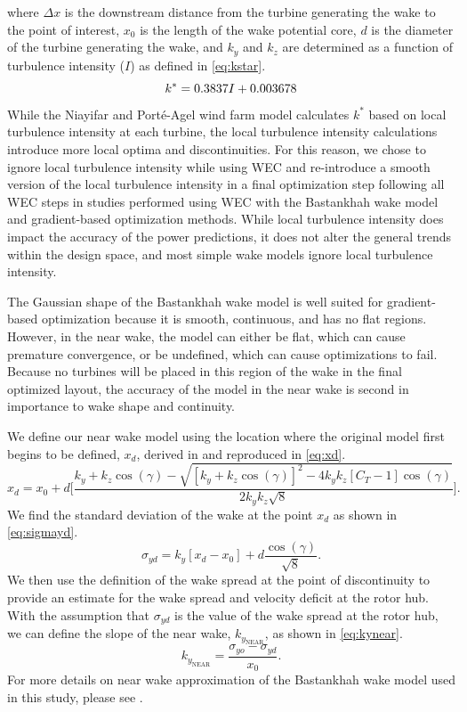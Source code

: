 \documentclass[journal abbreviation, manuscript]{copernicus}
\begin{document}
	where $\Delta x$ is the downstream distance from the turbine generating the wake to the point of interest, $x_0$ is the length of the wake potential core, $d$ is the diameter of the turbine generating the wake, and $k_y$ and $k_z$ are determined as a function of turbulence intensity ($I$) as defined in \ref{eq:kstar}\cite{niayifar2016}.
	\begin{equation}\label{eq:kstar}
		\centering
		k^* = 0.3837I + 0.003678
	\end{equation}
	While the Niayifar and Port\'e-Agel wind farm model calculates $k^*$ based on local turbulence intensity at each turbine, the local turbulence intensity calculations introduce more local optima and discontinuities. For this reason, we chose to ignore local turbulence intensity while using WEC and re-introduce a smooth version of the local turbulence intensity in a final optimization step following all WEC steps in studies performed using WEC with the Bastankhah wake model and gradient-based optimization methods. While local turbulence intensity does impact the accuracy of the power predictions, it does not alter the general trends within the design space, and most simple wake models ignore local turbulence intensity. 
	
	The Gaussian shape of the Bastankhah wake model is well suited for gradient-based optimization because it is smooth, continuous, and has no flat regions. However, in the near wake, the model can either be flat, which can cause premature convergence, or be undefined, which can cause optimizations to fail. Because no turbines will be placed in this region of the wake in the final optimized layout, the accuracy of the model in the near wake is second in importance to wake shape and continuity. 
	
	We define our near wake model using the location where the original model first begins to be defined, $x_d$, derived in \cite{thomas2019-les-validation} and reproduced in \ref{eq:xd}.
	\begin{equation}\label{eq:xd}
		x_d = x_0 +d \Bigg[ \frac{k_y+k_z\cos{(\gamma)} - \sqrt{[k_y+k_z\cos{(\gamma)}]^2-4k_y k_z[C_T-1]\cos{(\gamma)}}}{2k_y k_z\sqrt{8}}\Bigg].
	\end{equation}
	We find the standard deviation of the wake at the point $x_d$ as shown in \ref{eq:sigmayd}.
	\begin{equation}\label{eq:sigmayd}
		\sigma_{yd} = k_y [x_d - x_0] + d\frac{\cos{(\gamma)}}{\sqrt{8}}.
	\end{equation}
	We then use the definition of the wake spread at the point of discontinuity to provide an estimate for the wake spread and velocity deficit at the rotor hub. With the assumption that $\sigma_{yd}$ is the value of the wake spread at the rotor hub, we can define the slope of the near wake, $k_{y_{\text{NEAR}}}$, as shown in \ref{eq:kynear}.
	\begin{equation}\label{eq:kynear}
		k_{y_{\text{NEAR}}} = \frac{\sigma_{yo}-\sigma_{yd}}{x_0}.
	\end{equation}
	For more details on near wake approximation of the Bastankhah wake model used in this study, please see \cite{thomas2019-les-validation}.
	
\end{document}
